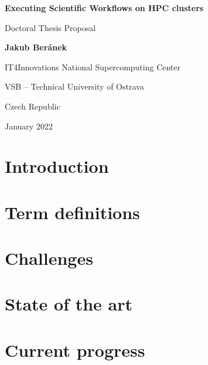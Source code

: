 \documentclass[11pt]{article}
\begin{document}
\begin{titlepage}
    \begin{center}
        \vspace*{1cm}
        \par
        \Huge
        \textbf{Executing Scientific Workflows on HPC clusters}
        \par
        \vspace{0.5cm}
        \LARGE
        Doctoral Thesis Proposal
        \par
        \vspace{1.5cm}
        \par
        \textbf{Jakub Beránek}
        \par
        \vspace{9.cm}
        \par
        {
            \Large
            IT4Innovations National Supercomputing Center\par
            VSB -- Technical University of Ostrava\par
            Czech Republic\par
            January 2022
        }
    \end{center}
\end{titlepage}

\tableofcontents
\clearpage

\section{Introduction}
\label{sec:introduction}


\section{Term definitions}
\label{sec:task_graph_definition}


\section{Challenges}
\label{sec:challenges}


\section{State of the art}
\label{sec:state_of_the_art}


\section{Current progress}
\label{sec:current_progress}

\end{document}
